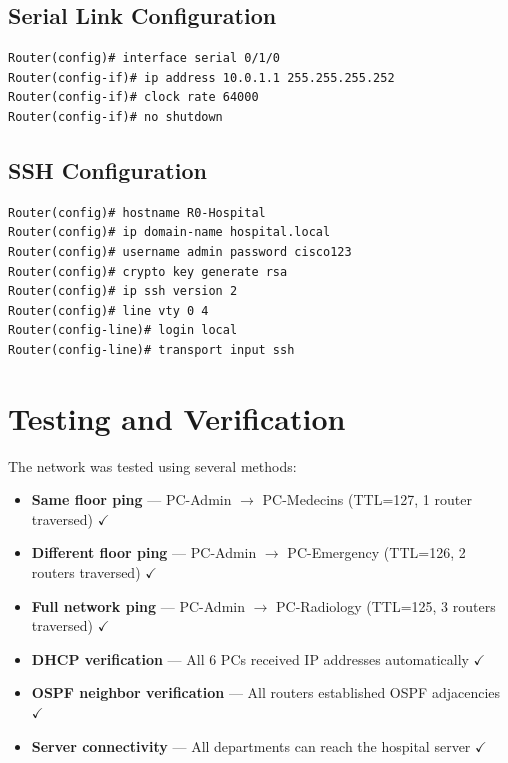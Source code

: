 \documentclass[12pt, a4paper]{article}
\begin{document}
\subsection{Serial Link Configuration}
\begin{lstlisting}
Router(config)# interface serial 0/1/0
Router(config-if)# ip address 10.0.1.1 255.255.255.252
Router(config-if)# clock rate 64000
Router(config-if)# no shutdown
\end{lstlisting}

\subsection{SSH Configuration}
\begin{lstlisting}
Router(config)# hostname R0-Hospital
Router(config)# ip domain-name hospital.local
Router(config)# username admin password cisco123
Router(config)# crypto key generate rsa
Router(config)# ip ssh version 2
Router(config)# line vty 0 4
Router(config-line)# login local
Router(config-line)# transport input ssh
\end{lstlisting}

\section{Testing and Verification}

The network was tested using several methods:

\begin{itemize}
    \item \textbf{Same floor ping} --- PC-Admin $\rightarrow$ PC-Medecins 
    (TTL=127, 1 router traversed) $\checkmark$
    
    \item \textbf{Different floor ping} --- PC-Admin $\rightarrow$ PC-Emergency 
    (TTL=126, 2 routers traversed) $\checkmark$
    
    \item \textbf{Full network ping} --- PC-Admin $\rightarrow$ PC-Radiology 
    (TTL=125, 3 routers traversed) $\checkmark$
    
    \item \textbf{DHCP verification} --- All 6 PCs received IP addresses 
    automatically $\checkmark$
    
    \item \textbf{OSPF neighbor verification} --- All routers established 
    OSPF adjacencies $\checkmark$
    
    \item \textbf{Server connectivity} --- All departments can reach the 
    hospital server $\checkmark$
\end{itemize}
\end{document}
